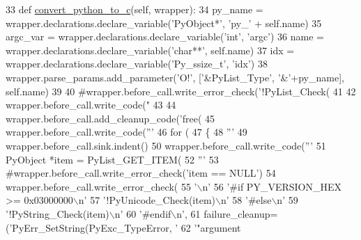 \begin{DoxyCode}
33     \textcolor{keyword}{def }\hyperlink{classmodulegen__customizations_1_1ArgvParam_ad518a7e0a127f301ff0ee0f8b9ad1fed}{convert\_python\_to\_c}(self, wrapper):
34         py\_name = wrapper.declarations.declare\_variable(\textcolor{stringliteral}{'PyObject*'}, \textcolor{stringliteral}{'py\_'} + self.name)
35         argc\_var = wrapper.declarations.declare\_variable(\textcolor{stringliteral}{'int'}, \textcolor{stringliteral}{'argc'})
36         name = wrapper.declarations.declare\_variable(\textcolor{stringliteral}{'char**'}, self.name)
37         idx = wrapper.declarations.declare\_variable(\textcolor{stringliteral}{'Py\_ssize\_t'}, \textcolor{stringliteral}{'idx'})
38         wrapper.parse\_params.add\_parameter(\textcolor{stringliteral}{'O!'}, [\textcolor{stringliteral}{'&PyList\_Type'}, \textcolor{stringliteral}{'&'}+py\_name], self.name)
39 
40         \textcolor{comment}{#wrapper.before\_call.write\_error\_check('!PyList\_Check(%
41 
42         wrapper.before\_call.write\_code(\textcolor{stringliteral}{"%
43                                        %
44         wrapper.before\_call.add\_cleanup\_code(\textcolor{stringliteral}{'free(%
45         wrapper.before\_call.write\_code(\textcolor{stringliteral}{'''}
46 \textcolor{stringliteral}{for (%
47 \textcolor{stringliteral}{\{}
48 \textcolor{stringliteral}{'''} %
49         wrapper.before\_call.sink.indent()
50         wrapper.before\_call.write\_code(\textcolor{stringliteral}{'''}
51 \textcolor{stringliteral}{PyObject *item = PyList\_GET\_ITEM(%
52 \textcolor{stringliteral}{'''} %
53         \textcolor{comment}{#wrapper.before\_call.write\_error\_check('item == NULL')}
54         wrapper.before\_call.write\_error\_check(
55             \textcolor{stringliteral}{'\(\backslash\)n'}
56             \textcolor{stringliteral}{'#if PY\_VERSION\_HEX >= 0x03000000\(\backslash\)n'}
57             \textcolor{stringliteral}{'!PyUnicode\_Check(item)\(\backslash\)n'}
58             \textcolor{stringliteral}{'#else\(\backslash\)n'}
59             \textcolor{stringliteral}{'!PyString\_Check(item)\(\backslash\)n'}
60             \textcolor{stringliteral}{'#endif\(\backslash\)n'},
61             failure\_cleanup=(\textcolor{stringliteral}{'PyErr\_SetString(PyExc\_TypeError, '}
62                              \textcolor{stringliteral}{'"argument %
}}}}}}
\end{DoxyCode}
